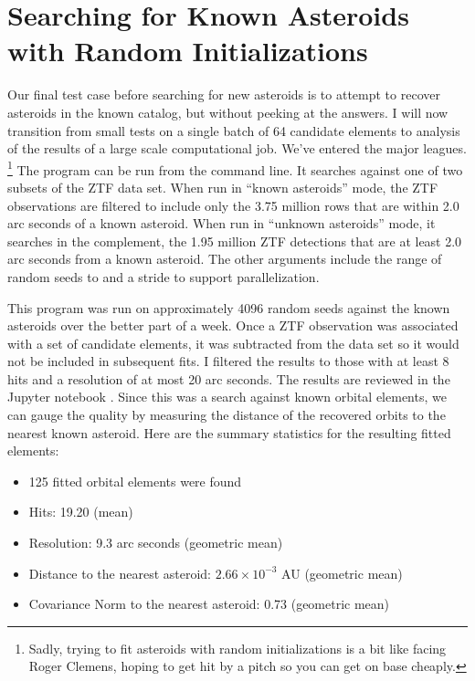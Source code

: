 \section{Searching for Known Asteroids with Random Initializations}
\label{section_results_known_ast_random}
Our final test case before searching for new asteroids is to attempt to recover asteroids in the known catalog, but without peeking at the answers.
I will now transition from small tests on a single batch of 64 candidate elements to analysis of the results of a large scale computational job.
We've entered the major leagues.
\footnote{Sadly, trying to fit asteroids with random initializations is a bit like facing Roger Clemens,
hoping to get hit by a pitch so you can get on base cheaply.}
The program  can be run from the command line.
It searches against one of two subsets of the ZTF data set.
When run in ``known asteroids'' mode, the ZTF observations are filtered to include only the 3.75 million rows that are within 2.0 arc seconds of a known asteroid.
When run in ``unknown asteroids'' mode, it searches in the complement, the 1.95 million ZTF detections that are at least 2.0 arc seconds from a known asteroid.
The other arguments include the range of random seeds  to  and a stride to support parallelization.

This program was run on approximately 4096 random seeds against the known asteroids over the better part of a week.
Once a ZTF observation was associated with a set of candidate elements, it was subtracted from the data set so it would not be included in subsequent fits.
I filtered the results to those with at least 8 hits and a resolution of at most 20 arc seconds.
The results are reviewed in the Jupyter notebook .
Since this was a search against known orbital elements, 
we can gauge the quality by measuring the distance of the recovered orbits to the nearest known asteroid.
Here are the summary statistics for the resulting fitted elements:
\begin{itemize}
\item 125 fitted orbital elements were found
\item Hits: 19.20 (mean)
\item Resolution: 9.3 arc seconds (geometric mean)
\item Distance to the nearest asteroid: $2.66 \times 10^{-3}$ AU (geometric mean)
\item Covariance Norm to the nearest asteroid: 0.73 (geometric mean)
\end{itemize}

